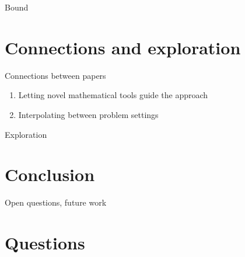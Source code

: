\documentclass{beamer}
\begin{document}
\begin{frame}{Bound}
\end{frame}

\section{Connections and exploration}
\begin{frame}{Connections between papers}
  \begin{enumerate}
  \item
    Letting novel mathematical tools guide the approach
  \item 
    Interpolating between problem settings
  \end{enumerate}
\end{frame}

\begin{frame}{Exploration}
\end{frame}

\section{Conclusion}
\begin{frame}{Open questions, future work}
\end{frame}

\section{Questions}
\end{document}
